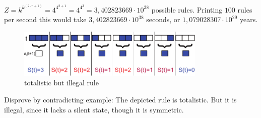 \documentclass[10pt,a4paper,boxed]{hmcpset}
\begin{document}
\begin{problem}[Assignment 9]
\end{problem}
\begin{solution}
$Z = k^{k^{(2 \cdot r+1)}} = 4^{4^{2+1}} = 4^{4^{3}} = 3,402823669 \cdot 10^{38}$ possible rules. Printing $100$ rules per second this would take $3,402823669 \cdot 10^{38}$ seconds, or $1,079028307 \cdot 10^{29}$ years.
\end{solution}

\begin{problem}[Assignment 10]
\end{problem}
	\begin{figure}[h!]
		\centering
		\includegraphics[width=0.8\textwidth]{img/task10}
	\caption{totalistic but illegal rule}
	\end{figure}
Disprove by contradicting example: The depicted rule is totalistic. But it is illegal, since it lacks a silent state, though it is symmetric.
\begin{solution}
\end{solution}

\begin{problem}[Assignment 11]
\end{problem}
\begin{solution}
\end{solution}
\end{document}
